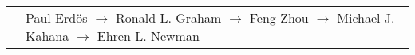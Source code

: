 \documentclass[11pt]{cooperCV_v1/cooperCV} %
\begin{document}
\begin{minipage}{\textwidth}







\begin{tabular}{ @{} p{} p{} @{} }
  
  \small \textcolor{gray}{{\emph{ }}} & {\small Paul Erdös $\rightarrow$ Ronald L. Graham $\rightarrow$ Feng Zhou $\rightarrow$ Michael J. Kahana $\rightarrow$ Ehren L. Newman} \\
  
\end{tabular}




\end{minipage}










	

\end{document}
